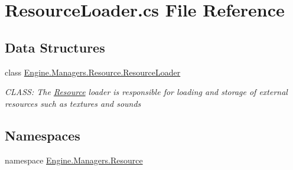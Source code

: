 \hypertarget{a00179}{}\section{Resource\+Loader.\+cs File Reference}
\label{a00179}
\subsection*{Data Structures}
\begin{DoxyCompactItemize}
\item 
class \hyperlink{a00530}{Engine.\+Managers.\+Resource.\+Resource\+Loader}
\begin{DoxyCompactList}\small\item\em C\+L\+A\+SS\+: The \hyperlink{a00272}{Resource} loader is responsible for loading and storage of external resources such as textures and sounds \end{DoxyCompactList}\end{DoxyCompactItemize}
\subsection*{Namespaces}
\begin{DoxyCompactItemize}
\item 
namespace \hyperlink{a00272}{Engine.\+Managers.\+Resource}
\end{DoxyCompactItemize}
